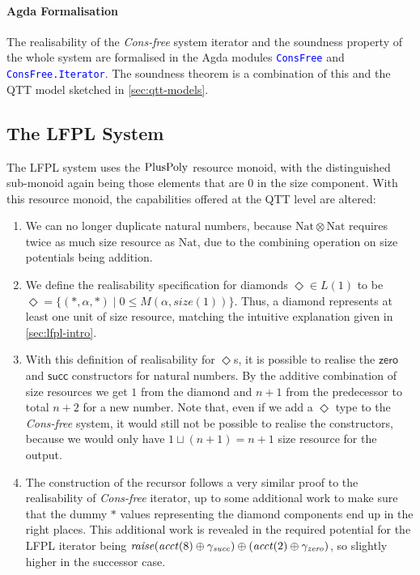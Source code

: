 \documentclass[acmsmall,screen]{acmart}
\newcommand{\tyNat}{\mathrm{Nat}}
\newcommand{\conZero}{\mathsf{zero}}
\newcommand{\conSucc}{\mathsf{succ}}
\newcommand{\AgdaModule}[1]{\textcolor{blue}{\tt #1}}
\begin{document}
\paragraph{Agda Formalisation} The realisability of the
\emph{Cons-free} system iterator and the soundness property of the
whole system are formalised in the Agda modules \AgdaModule{ConsFree}
and \AgdaModule{ConsFree.Iterator}. The soundness theorem is a
combination of this and the QTT model sketched in
\autoref{sec:qtt-models}.

\subsection{The LFPL System}
\label{sec:lfpl-sound}

The LFPL system uses the $\mathrm{PlusPoly}$ resource monoid, with the
distinguished sub-monoid again being those elements that are $0$ in
the size component. With this resource monoid, the capabilities
offered at the QTT level are altered:
\begin{enumerate}
\item We can no longer duplicate natural numbers, because
  $\tyNat \otimes \tyNat$ requires twice as much size resource as
  $\tyNat$, due to the combining operation on size potentials being
  addition.
\item We define the realisability specification for diamonds
  $\Diamond \in L(1)$ to be
  $\Diamond = \{ (*, \alpha, *) \mid 0 \leq M(\alpha,
  \mathit{size}(1)) \}$.  Thus, a diamond represents at least one unit
  of size resource, matching the intuitive explanation given in
  \autoref{sec:lfpl-intro}.
\item With this definition of realisability for $\Diamond$s, it is
  possible to realise the $\conZero$ and $\conSucc$ constructors for
  natural numbers. By the additive combination of size resources we
  get $1$ from the diamond and $n+1$ from the predecessor to total
  $n+2$ for a new number. Note that, even if we add a $\Diamond$ type
  to the \emph{Cons-free} system, it would still not be possible to
  realise the constructors, because we would only have
  $1 \sqcup (n+1) = n+1$ size resource for the output.
\item The construction of the recursor follows a very similar proof to
  the realisability of \emph{Cons-free} iterator, up to some
  additional work to make sure that the dummy $*$ values representing
  the diamond components end up in the right places. This additional
  work is revealed in the required potential for the LFPL iterator
  being
  $\mathit{raise}(\mathit{acct}(8) \oplus \gamma_{\mathit{succ}})
  \oplus (\mathit{acct}(2) \oplus \gamma_{\mathit{zero}})$, so
  slightly higher in the successor case.
\end{enumerate}
\end{document}
